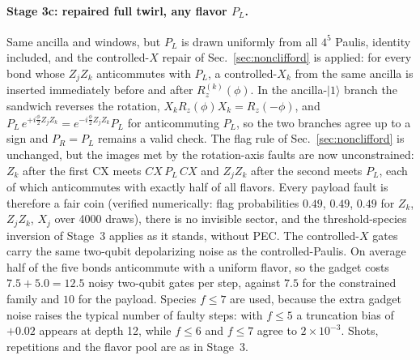 \documentclass[11pt,a4paper]{article}
\theoremstyle{remark}
\begin{document}
\paragraph{Stage 3c: repaired full twirl, any flavor $P_L$.} Same ancilla and windows, but $P_L$ is drawn uniformly from all $4^5$ Paulis, identity included, and the controlled-$X$ repair of Sec.~\ref{sec:nonclifford} is applied: for every bond whose $Z_jZ_k$ anticommutes with $P_L$, a controlled-$X_k$ from the same ancilla is inserted immediately before and after $R_z^{(k)}(\phi)$. In the ancilla-$|1\rangle$ branch the sandwich reverses the rotation, $X_kR_z(\phi)X_k=R_z(-\phi)$, and $P_L\,e^{+i\frac\phi2Z_jZ_k}=e^{-i\frac\phi2Z_jZ_k}P_L$ for anticommuting $P_L$, so the two branches agree up to a sign and $P_R=P_L$ remains a valid check. The flag rule of Sec.~\ref{sec:nonclifford} is unchanged, but the images met by the rotation-axis faults are now unconstrained: $Z_k$ after the first CX meets $CX\,P_L\,CX$ and $Z_jZ_k$ after the second meets $P_L$, each of which anticommutes with exactly half of all flavors. Every payload fault is therefore a fair coin (verified numerically: flag probabilities $0.49$, $0.49$, $0.49$ for $Z_k$, $Z_jZ_k$, $X_j$ over 4000 draws), there is no invisible sector, and the threshold-species inversion of Stage~3 applies as it stands, without PEC. The controlled-$X$ gates carry the same two-qubit depolarizing noise as the controlled-Paulis. On average half of the five bonds anticommute with a uniform flavor, so the gadget costs $7.5+5.0=12.5$ noisy two-qubit gates per step, against $7.5$ for the constrained family and $10$ for the payload. Species $f\le7$ are used, because the extra gadget noise raises the typical number of faulty steps: with $f\le5$ a truncation bias of $+0.02$ appears at depth 12, while $f\le6$ and $f\le7$ agree to $2\times10^{-3}$. Shots, repetitions and the flavor pool are as in Stage~3.
\end{document}
